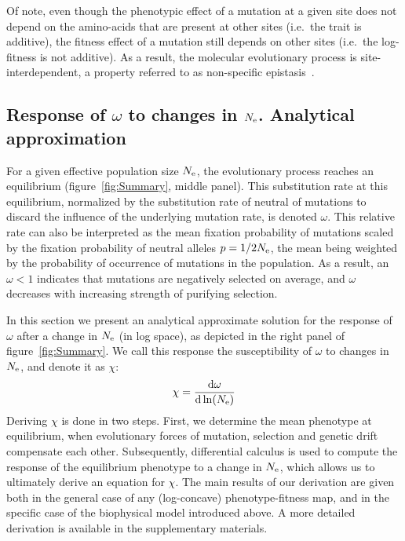 \documentclass{article}
\begin{document}
Of note, even though the phenotypic effect of a mutation at a given site does not depend on the amino-acids that are present at other sites (i.e.~the trait is additive), the fitness effect of a mutation still depends on other sites (i.e.~the log-fitness is not additive).
As a result, the molecular evolutionary process is site-interdependent, a property referred to as non-specific epistasis~\citep{Starr2016,Dasmeh2018}.

\subsection{Response of $\omega$ to changes in $N_{\text{e}}$. Analytical approximation}

For a given {effective population size} $N_{\text{e}}$, the evolutionary process reaches an equilibrium (figure~\ref{fig:Summary}, middle panel).
This {substitution} rate at this equilibrium, normalized by the {substitution} rate of {neutral} of mutations to discard the influence of the underlying mutation rate, is denoted $\omega$.
This relative rate can also be interpreted as the mean fixation probability of mutations scaled by the fixation probability of {neutral} {alleles} $p = 1 / {2 N_{\text{e}}}$, the mean being weighted by the probability of occurrence of mutations in the population.
As a result, an $\omega < 1$ indicates that mutations are negatively selected on average, and $\omega$ decreases with increasing strength of purifying selection.

In this section we present an analytical approximate solution for the response of $\omega$ after a change in $N_{\text{e}}$ (in log space), as depicted in the right panel of figure~\ref{fig:Summary}.
We call this response the susceptibility of $\omega$ to changes in $N_{\text{e}}$, and denote it as $\chi$:
\begin{align}
    \chi = \frac{ \mathrm{d} \omega}{\mathrm{d} \ln (N_{\text{e}})} \label{eq:chi}
\end{align}
Deriving $\chi$ is done in two steps.
First, we determine the mean {phenotype} at equilibrium, when evolutionary forces of mutation, selection and {genetic drift} compensate each other.
Subsequently, differential calculus is used to compute the response of the equilibrium {phenotype} to a change in $N_{\text{e}}$, which allows us to ultimately derive an equation for $\chi$.
The main results of our derivation are given both in the general case of any (log-concave) phenotype-fitness map, and in the specific case of the biophysical model introduced above.
A more detailed derivation is available in the supplementary materials.
\end{document}
